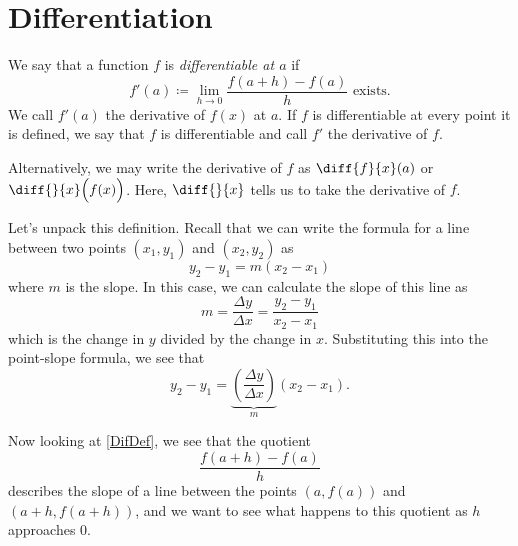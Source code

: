 \section{Differentiation}





\begin{defn}\label{DifDef}
	We say that a function $f$ is \emph{differentiable at $a$} if
	\begin{equation}
		f'(a)\coloneqq\lim\limits_{h\to 0}\frac{f(a+h)-f(a)}{h} \text{ exists}.
	\end{equation}
	We call $f'(a)$ the derivative of $f(x)$ at $a$. If $f$ is differentiable at every point it is defined, we say that $f$ is differentiable and call $f'$ the derivative of $f$.
\end{defn}
\begin{rem}
Alternatively, we may write the derivative of $f$ as $\diff{f}{x}(a)$ or $\diff{}{x}\Big(f(x)\Big)$. Here, $\diff{}{x}$ tells us to take the derivative of $f$.
\end{rem}
Let's unpack this definition. Recall that we can write the formula for a line between two points $(x_1, y_1)$ and $(x_2, y_2)$ as
\[
y_2 - y_1 = m(x_2-x_1)
\]
where $m$ is the slope. In this case, we can calculate the slope of this line as
\[
m = \frac{\Delta y}{\Delta x} = \frac{y_2 - y_1}{x_2 - x_1}
\]
which is the change in $y$ divided by the change in $x$. Substituting this into the point-slope formula, we see that
\[
y_2-y_1 = \underbrace{ \left( \frac{\Delta y}{\Delta x} \right) }_{m}(x_2-x_1).
\]

Now looking at \cref{DifDef}, we see that the quotient
\[
\frac{f(a+h)-f(a)}{h}
\] describes the slope of a line between the points $(a, f(a))$ and $(a+h, f(a+h))$, and we want to see what happens to this quotient as $h$ approaches 0.

